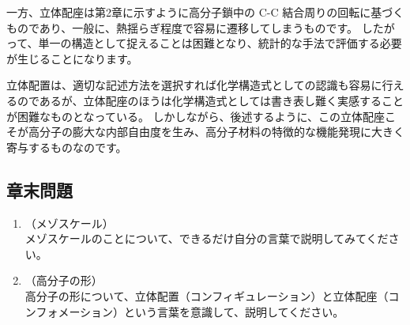\documentclass[a4paper,11pt]{ltjsarticle}
\begin{document}
一方、立体配座は第2章に示すように高分子鎖中の C-C 結合周りの回転に基づくものであり、一般に、熱揺らぎ程度で容易に遷移してしまうものです。
したがって、単一の構造として捉えることは困難となり、統計的な手法で評価する必要が生じることになります。

立体配置は、適切な記述方法を選択すれば化学構造式としての認識も容易に行えるのであるが、立体配座のほうは化学構造式としては書き表し難く実感することが困難なものとなっている。
しかしながら、後述するように、この立体配座こそが高分子の膨大な内部自由度を生み、高分子材料の特徴的な機能発現に大きく寄与するものなのです。

\subsection{章末問題}

	\begin{enumerate}
		\item
		（メゾスケール）\\
		メゾスケールのことについて、できるだけ自分の言葉で説明してみてください。
		\item
		（高分子の形）\\
		高分子の形について、立体配置（コンフィギュレーション）と立体配座（コンフォメーション）という言葉を意識して、説明してください。

	\end{enumerate}
\end{document}

